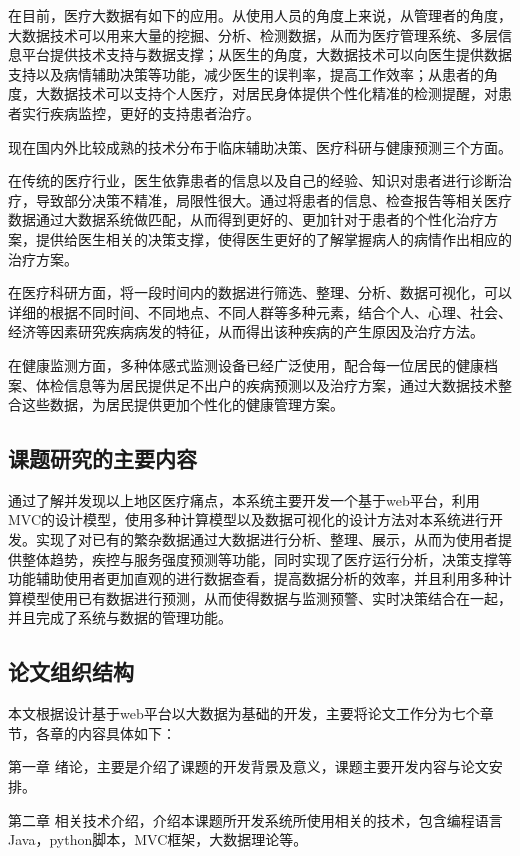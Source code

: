 \documentclass{husethesis}
\begin{document}
在目前，医疗大数据有如下的应用。从使用人员的角度上来说，从管理者的角度，大数据技术可以用来大量的挖掘、分析、检测数据，从而为医疗管理系统、多层信息平台提供技术支持与数据支撑；从医生的角度，大数据技术可以向医生提供数据支持以及病情辅助决策等功能，减少医生的误判率，提高工作效率；从患者的角度，大数据技术可以支持个人医疗，对居民身体提供个性化精准的检测提醒，对患者实行疾病监控，更好的支持患者治疗。

现在国内外比较成熟的技术分布于临床辅助决策、医疗科研与健康预测三个方面。

在传统的医疗行业，医生依靠患者的信息以及自己的经验、知识对患者进行诊断治疗，导致部分决策不精准，局限性很大。通过将患者的信息、检查报告等相关医疗数据通过大数据系统做匹配，从而得到更好的、更加针对于患者的个性化治疗方案，提供给医生相关的决策支撑，使得医生更好的了解掌握病人的病情作出相应的治疗方案。

在医疗科研方面，将一段时间内的数据进行筛选、整理、分析、数据可视化，可以详细的根据不同时间、不同地点、不同人群等多种元素，结合个人、心理、社会、经济等因素研究疾病病发的特征，从而得出该种疾病的产生原因及治疗方法。

在健康监测方面，多种体感式监测设备已经广泛使用，配合每一位居民的健康档案、体检信息等为居民提供足不出户的疾病预测以及治疗方案，通过大数据技术整合这些数据，为居民提供更加个性化的健康管理方案。

\subsection{课题研究的主要内容}
\setlength{\parindent}{2\ccwd}%
通过了解并发现以上地区医疗痛点，本系统主要开发一个基于web平台，利用MVC的设计模型，使用多种计算模型以及数据可视化的设计方法对本系统进行开发。实现了对已有的繁杂数据通过大数据进行分析、整理、展示，从而为使用者提供整体趋势，疾控与服务强度预测等功能，同时实现了医疗运行分析，决策支撑等功能辅助使用者更加直观的进行数据查看，提高数据分析的效率，并且利用多种计算模型使用已有数据进行预测，从而使得数据与监测预警、实时决策结合在一起，并且完成了系统与数据的管理功能。

\subsection{论文组织结构}
本文根据设计基于web平台以大数据为基础的开发，主要将论文工作分为七个章节，各章的内容具体如下：

第一章 绪论，主要是介绍了课题的开发背景及意义，课题主要开发内容与论文安排。

第二章 相关技术介绍，介绍本课题所开发系统所使用相关的技术，包含编程语言Java，python脚本，MVC框架，大数据理论等。
\end{document}
